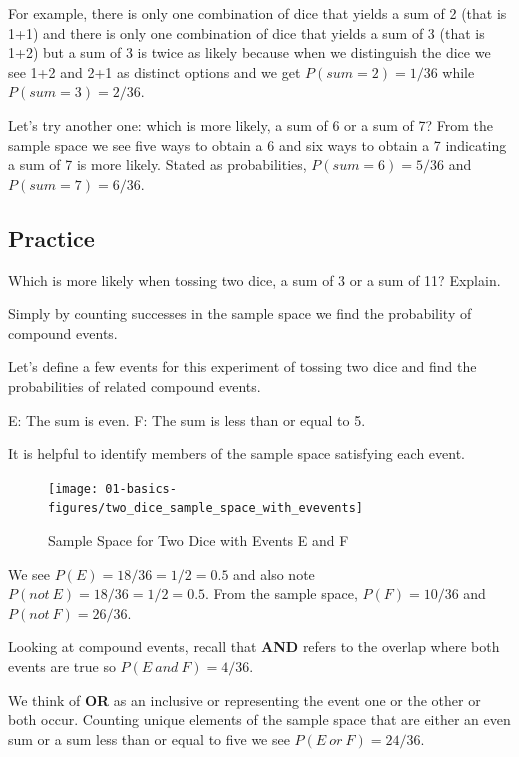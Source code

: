 \documentclass[]{book}
\theoremstyle{definition}
\theoremstyle{definition}
\theoremstyle{definition}
\theoremstyle{remark}
\begin{document}
For example, there is only one combination of dice that yields a sum of
2 (that is 1+1) and there is only one combination of dice that yields a
sum of 3 (that is 1+2) but a sum of 3 is twice as likely because when we
distinguish the dice we see 1+2 and 2+1 as distinct options and we get
\(P(sum=2)=1/36\) while \(P(sum=3)=2/36\).

Let's try another one: which is more likely, a sum of 6 or a sum of 7?
From the sample space we see five ways to obtain a 6 and six ways to
obtain a 7 indicating a sum of 7 is more likely. Stated as
probabilities, \(P(sum=6)=5/36\) and \(P(sum=7)=6/36\).

\subsection{Practice}\label{practice}

Which is more likely when tossing two dice, a sum of 3 or a sum of 11?
Explain.

Simply by counting successes in the sample space we find the probability
of compound events.

Let's define a few events for this experiment of tossing two dice and
find the probabilities of related compound events.

E: The sum is even. F: The sum is less than or equal to 5.

It is helpful to identify members of the sample space satisfying each
event.

\begin{figure}

{\centering \texttt{[image: 01-basics-figures/two\_dice\_sample\_space\_with\_evevents]} 

}

\caption{Sample Space for Two Dice with Events E and F}\label{fig:nice-fig-24}
\end{figure}

We see \(P(E)=18/36=1/2=0.5\) and also note
\(P(not \ E)=18/36=1/2=0.5\). From the sample space, \(P(F)=10/36\) and
\(P(not \ F)=26/36\).

Looking at compound events, recall that \textbf{AND} refers to the
overlap where both events are true so \(P(E \ and \ F)=4/36\).

We think of \textbf{OR} as an inclusive or representing the event one or
the other or both occur. Counting unique elements of the sample space
that are either an even sum or a sum less than or equal to five we see
\(P(E \ or \ F)=24/36\).
\end{document}
